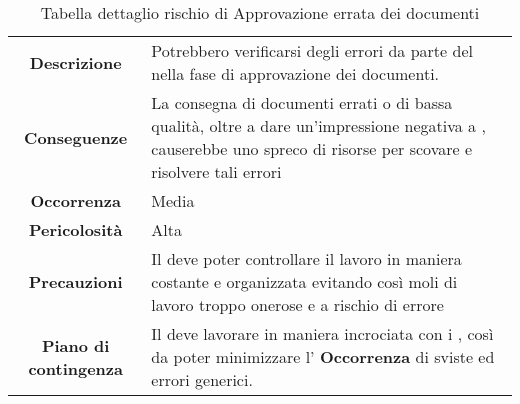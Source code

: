 \renewcommand{\arraystretch}{1}
    \begin{table}[H]
        \begin{center}
            \setlength{\aboverulesep}{0pt}
            \setlength{\belowrulesep}{0pt}
            \setlength{\extrarowheight}{.75ex}
            \begin{tabular}{ c p{10cm} }
                		\toprule 
		\rowcolor{AzzurroGruppo!30}
		\multicolumn{2}{c}{\textbf{Approvazione errata dei documenti}}\\
                \toprule
                \textbf{Descrizione} & Potrebbero verificarsi degli errori da parte del \RdP{} nella fase di approvazione dei documenti. \\
                \textbf{Conseguenze} & La consegna di documenti errati o di bassa qualità, oltre a dare un'impressione negativa a \proponente{}, causerebbe uno spreco di risorse per scovare e risolvere tali errori \\
                 \textbf{Occorrenza} & Media \\
                \textbf{Pericolosità}  & Alta \\
                \textbf{Precauzioni} & Il \RdP{} deve poter controllare il lavoro in maniera costante e organizzata evitando così moli di lavoro troppo onerose e a rischio di errore \\
                 \textbf{Piano di contingenza} & Il \RdP{} deve lavorare in maniera incrociata con i \vers{}, così da poter minimizzare l' \textbf{Occorrenza} di sviste ed errori generici. \\
                \bottomrule
            \end{tabular}
            \caption{Tabella dettaglio rischio di Approvazione errata dei documenti}
        \end{center}
    \end{table}


